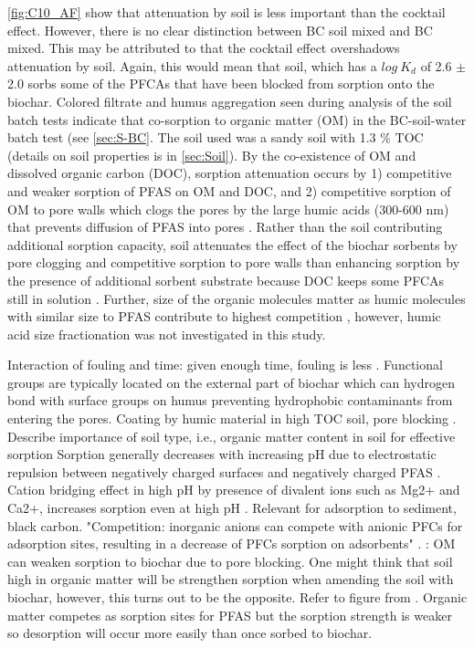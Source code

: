 \cref{fig:C10_AF} show that attenuation by soil is less important than the cocktail effect. However, there is no clear distinction between BC soil mixed and BC mixed. This may be attributed to that the cocktail effect overshadows attenuation by soil. Again, this would mean that soil, which has a $log~K_d$ of 2.6 $\pm$ 2.0 sorbs some of the PFCAs that have been blocked from sorption onto the biochar. 
Colored filtrate and humus aggregation seen during analysis of the soil batch tests indicate that co-sorption to organic matter (OM) in the BC-soil-water batch test (see \cref{sec:S-BC}. The soil used was a sandy soil with 1.3 \% TOC (details on soil properties is in \cref{sec:Soil}). By the co-existence of OM and dissolved organic carbon (DOC), sorption attenuation occurs by 1) competitive and weaker sorption of PFAS on OM and DOC, and 2) competitive sorption of OM to pore walls which clogs the pores by the large humic acids (300-600 nm) that prevents diffusion of PFAS into pores \citep{Cornelissen2006,kluvcakova2018size}. Rather than the soil contributing additional sorption capacity, soil attenuates the effect of the biochar sorbents by pore clogging and competitive sorption to pore walls than enhancing sorption by the presence of additional sorbent substrate because DOC keeps some PFCAs still in solution \citep{Li2019}. Further, size of the organic molecules matter as humic molecules with similar size to PFAS contribute to highest competition \citep{du2014adsorption}, however, humic acid size fractionation was not investigated in this study.

Interaction of fouling and time: given enough time, fouling is less \citep{Werner2006}. Functional groups are typically located on the external part of biochar which can hydrogen bond with surface groups on humus preventing hydrophobic contaminants from entering the pores. Coating by humic material in high TOC soil, pore blocking \citep{Hale2011}. Describe importance of soil type, i.e., organic matter content in soil for effective sorption
Sorption generally decreases with increasing pH due to electrostatic repulsion between negatively charged surfaces and negatively charged PFAS \citep{du2014adsorption}. Cation bridging effect in high pH by presence of divalent ions such as Mg2+ and Ca2+, increases sorption even at high pH \citep{du2014adsorption}. Relevant for adsorption to sediment, black carbon. "Competition: inorganic anions can compete with anionic PFCs for adsorption sites, resulting in a decrease of PFCs sorption on adsorbents" \citep{du2014adsorption}. 
\citep{Sormo2021}: OM can weaken sorption to biochar due to pore blocking. One might think that soil high in organic matter will be strengthen sorption when amending the soil with biochar, however, this turns out to be the opposite. Refer to figure from \citep{Cornelissen2005}. Organic matter competes as sorption sites for PFAS but the sorption strength is weaker so desorption will occur more easily than once sorbed to biochar. 

